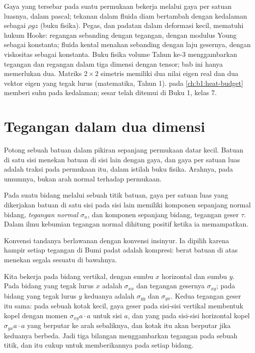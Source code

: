 \begin{recall}
Gaya yang tersebar pada suatu permukaan bekerja melalui gaya per satuan luasnya, dalam pascal; tekanan dalam fluida diam bertambah dengan kedalaman sebagai $\rho g z$ (buku fisika). Pegas, dan padatan dalam deformasi kecil, mematuhi hukum Hooke: regangan sebanding dengan tegangan, dengan modulus Young sebagai konstanta; fluida kental menahan sebanding dengan laju gesernya, dengan viskositas sebagai konstanta. Buku fisika volume Tahun ke-3 menggambarkan tegangan dan regangan dalam tiga dimensi dengan tensor; bab ini hanya memerlukan dua. Matriks $2\times2$ simetris memiliki dua nilai eigen real dan dua vektor eigen yang tegak lurus (matematika, Tahun 1).  pada \cref{ch:b1:heat-budget} memberi suhu pada kedalaman; sesar telah ditemui di Buku 1, kelas 7.
\end{recall}

\section{Tegangan dalam dua dimensi}\label{sec:b1:stress-strain-rheology:stress}

Potong sebuah batuan dalam pikiran sepanjang permukaan datar kecil. Batuan di satu sisi menekan batuan di sisi lain dengan gaya, dan gaya per satuan luas adalah traksi pada permukaan itu, dalam istilah buku fisika. Arahnya, pada umumnya, bukan arah normal terhadap permukaan.

\begin{definition}\label{def:b1:stress-strain-rheology:stress}
Pada suatu bidang melalui sebuah titik batuan, gaya per satuan luas yang dikerjakan batuan di satu sisi pada sisi lain memiliki komponen sepanjang normal bidang, \emph{tegangan normal} $\sigma_n$, dan komponen sepanjang bidang, tegangan geser $\tau$. Dalam ilmu kebumian tegangan normal dihitung positif ketika ia memampatkan.
\end{definition}

Konvensi tandanya berlawanan dengan konvensi insinyur. Ia dipilih karena hampir setiap tegangan di Bumi padat adalah kompresi: berat batuan di atas menekan segala sesuatu di bawahnya.

Kita bekerja pada bidang vertikal, dengan sumbu $x$ horizontal dan sumbu $y$. Pada bidang yang tegak lurus $x$  adalah $\sigma_{xx}$ dan tegangan gesernya $\sigma_{xy}$; pada bidang yang tegak lurus $y$ keduanya adalah $\sigma_{yy}$ dan $\sigma_{yx}$. Kedua tegangan geser itu sama: pada sebuah kotak kecil, gaya geser pada sisi-sisi vertikal membentuk kopel dengan momen $\sigma_{xy}a\cdot a$ untuk sisi $a$, dan yang pada sisi-sisi horizontal kopel $\sigma_{yx}a\cdot a$ yang berputar ke arah sebaliknya, dan kotak itu akan berputar jika keduanya berbeda. Jadi tiga bilangan menggambarkan tegangan pada sebuah titik, dan itu cukup untuk memberikannya pada setiap bidang.

